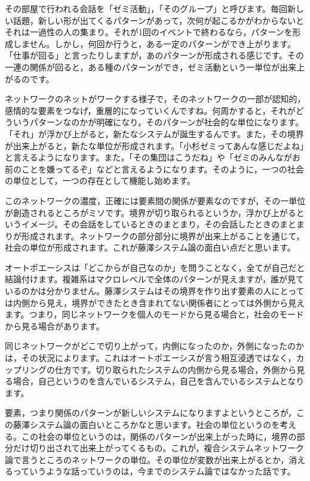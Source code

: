 \documentclass{ltjsbook}
\begin{document}
その部屋で行われる会話を「ゼミ活動」，「そのグループ」と呼びます。毎回新しい話題，新しい形が出てくるパターンがあって，次何が起こるかがわからないとそれは一過性の人の集まり。それが1回のイベントで終わるなら，パターンを形成しません。しかし，何回か行うと，ある一定のパターンができ上がります。「仕事が回る」と言ったりしますが，あのパターンが形成される感じです。その一連の関係が回ると，ある種のパターンができ，ゼミ活動という一単位が出来上がるのです。

ネットワークのネットがワークする様子で，そのネットワークの一部が認知的，感情的な要素をつなげ，重層的になっていくんですね。何周かすると，それがどういうパターンなのかが明確になり，そのパターンが社会的な単位になります。「それ」が浮かび上がると，新たなシステムが誕生するんです。また，その境界が出来上がると，新たな単位が形成されます。「小杉ゼミってあんな感じだよね」と言えるようになります。また，「その集団はこうだね」や「ゼミのみんながお前のことを嫌ってるぞ」などと言えるようになります。そのように，一つの社会の単位として，一つの存在として機能し始めます。

このネットワークの濃度，正確には要素間の関係が要素なのですが，その一単位が創造されるところがミソです。境界が切り取られるというか，浮かび上がるというイメージ。その会話をしているときのまとまり，その会話したときのまとまりが形成されます。ネットワークの部分部分に境界が出来上がることを通じて，社会の単位が形成されます。これが藤澤システム論の面白い点だと思います。

オートポエーシスは「どこからが自己なのか」を問うことなく，全てが自己だと結論付けます。複雑系はマクロレベルで全体のパターンが見えますが，誰が見ているのかは分かりません。藤澤システムはその境界を作り出す要素の人にとっては内側から見え，境界ができたとき含まれてない関係者にとっては外側から見えます。つまり，同じネットワークを個人のモードから見る場合と，社会のモードから見る場合があります。

同じネットワークがどこで切り上がって，内側になったのか，外側になったのかは，その状況によります。これはオートポエーシスが言う相互浸透ではなく，カップリングの仕方です。切り取られたシステムの内側から見る場合，外側から見る場合，自己というのを含んでいるシステム，自己を含んでいるシステムとなります。

要素，つまり関係のパターンが新しいシステムになりますよというところが，この藤澤システム論の面白いところかなと思います。社会の単位というのを考える。この社会の単位というのは，関係のパターンが出来上がった時に，境界の部分だけ切り出されて出来上がってくるもの。これが，複合システムネットワーク論で言うところのネットワークの単位。その単位が変数が出来上がるとか，消えるっていうような話っていうのは，今までのシステム論ではなかった話です。
\end{document}
